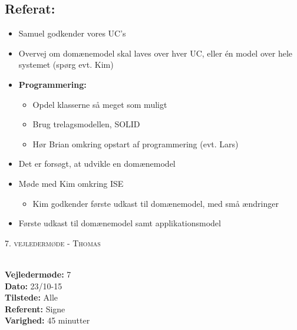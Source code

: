 \documentclass[a4paper,11pt,oneside]{memoir}
\begin{document}
\subsection{Referat:}
\begin{itemize}
\item Samuel godkender vores UC's
\item Overvej om domænemodel skal laves over hver UC, eller én model over hele systemet (spørg evt. Kim)
\item \textbf{Programmering:}
\begin{itemize}
\item Opdel klasserne så meget som muligt
\item Brug trelagsmodellen, SOLID 
\item Hør Brian omkring opstart af programmering (evt. Lars)
\end{itemize}
\item Det er forsøgt, at udvikle en domænemodel
\item Møde med Kim omkring ISE
\begin{itemize}
\item Kim godkender første udkast til domænemodel, med små ændringer
\end{itemize}
\item Første udkast til domænemodel samt applikationsmodel
\end{itemize}


\newpage



\begin{center} 
\huge{\textsc{7. vejledermøde - Thomas}}
\end{center}

\textbf{ }
\\
\textbf{Vejledermøde:} 7
\\
\textbf{Dato:} 23/10-15
\\
\textbf{Tilstede:} Alle
\\
\textbf{Referent:} Signe
\\
\textbf{Varighed:} 45 minutter
\\
\end{document}
